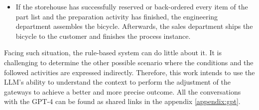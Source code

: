 \begin{itemize}
    \item If the storehouse has successfully reserved or back-ordered every item of the part list and the preparation activity has finished, the engineering department assembles the bicycle. Afterwards, the sales department ships the bicycle to the customer and finishes the process instance.
\end{itemize}

Facing such situation, the rule-based system can do little about it. It is challenging to determine the other possible scenario where the conditions and the followed activities are expressed indirectly. Therefore, this work intends to use the LLM's ability to understand the context to perform the adjustment of the gateways to achieve a better and more precise outcome. All the conversations with the GPT-4 can be found as shared links in the appendix \ref{appendix:gpt}.

